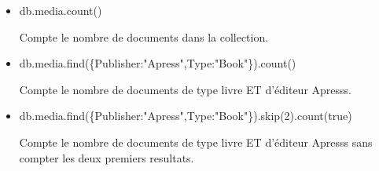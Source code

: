 \begin{itemize}
        \item \begin{tt} db.media.count() \end{tt} \newline
        Compte le nombre de documents dans la collection.
        \item \begin{tt} db.media.find(\{Publisher:"Apress",Type:"Book"\}).count()\end{tt} \newline
        Compte le nombre de documents de type livre ET d’éditeur Apresss.
        \item \begin{tt} db.media.find(\{Publisher:"Apress",Type:"Book"\}).skip(2).count(true) \end{tt} \newline
        Compte le nombre de documents de type livre ET d’éditeur Apresss sans compter les deux premiers resultats.
    \end{itemize}
